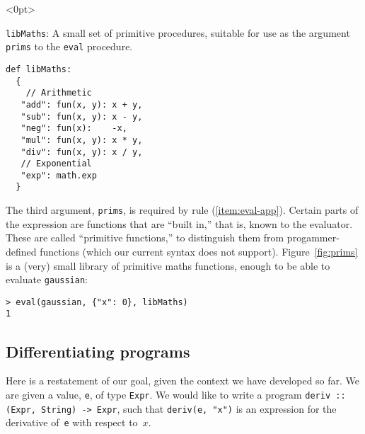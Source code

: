 \documentclass[11pt, a4paper]{article}
\newcommand{\cd}[1]{\texttt{#1}}
\begin{document}
\begin{marginfigure}<0pt>
  \caption{\cd{libMaths}: A small set of primitive procedures, suitable for use as
    the argument \cd{prims} to the \cd{eval} procedure.\label{fig:prims}}
\footnotesize
\begin{verbatim}
def libMaths:
  {
    // Arithmetic 
   "add": fun(x, y): x + y, 
   "sub": fun(x, y): x - y,
   "neg": fun(x):    -x,
   "mul": fun(x, y): x * y,
   "div": fun(x, y): x / y,
   // Exponential
   "exp": math.exp
  }
\end{verbatim}
\end{marginfigure}
The third argument, \cd{prims}, is required by rule
(\ref{item:eval-app}). Certain parts of the expression are functions
that are ``built in,'' that is, known to the evaluator. These are
called ``primitive functions,'' to distinguish them from
progammer-defined functions (which our current syntax does not
support). Figure~\ref{fig:prims} is a (very) small library of
primitive maths functions, enough to be able to evaluate
\cd{gaussian}:
\begin{verbatim}
> eval(gaussian, {"x": 0}, libMaths)
1
\end{verbatim}

\subsection{Differentiating programs}

Here is a restatement of our goal, given the context we have developed
so far. We are given a value, \cd{e}, of type \cd{Expr}. We would like
to write a program \cd{deriv :: (Expr, String) -> Expr}, such that
\cd{deriv(e, "x")} is an expression for the derivative of~\cd{e} with
respect to~$x$.

\end{document}
